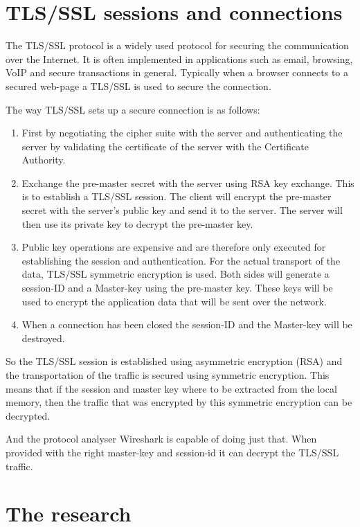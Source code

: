 \documentclass[12pt, a4paper]{report}
\begin{document}
\section{TLS/SSL sessions and connections}

The TLS/SSL protocol is a widely used protocol for securing the communication over the Internet. It is often implemented in applications such as email, browsing, VoIP and secure transactions in general. Typically when a browser connects to a secured web-page a TLS/SSL is used to secure the connection. 

The way TLS/SSL sets up a secure connection is as follows: 

\begin{enumerate}
\item First by negotiating the cipher suite with the server and  authenticating the server by validating the certificate of the server with the Certificate Authority. 
\item Exchange the pre-master secret with the server using RSA key exchange. This is to establish a TLS/SSL session. 
The client will encrypt the pre-master secret with the server's public key and send it to the server. The server will then use its private key to decrypt the pre-master key.
\item Public key operations are expensive and are therefore only executed for establishing the session and authentication. For the actual transport of the data, TLS/SSL symmetric encryption is used. Both sides will generate a session-ID and a Master-key using the pre-master key. These keys will be used to encrypt the application data that will be sent over the network.
\item When a connection has been closed the session-ID and the Master-key will be destroyed.  
\end{enumerate}

So the TLS/SSL session is established using asymmetric encryption (RSA) and the transportation of the traffic is secured using symmetric encryption. This means that if the session and master key where to be extracted from the local memory, then the traffic that was encrypted by this symmetric encryption can be decrypted. 

And the protocol analyser Wireshark is capable of doing just that. When provided with the right master-key and session-id it can decrypt the TLS/SSL traffic. \cite{ref1}

\newpage
\section{The research}
\end{document}
